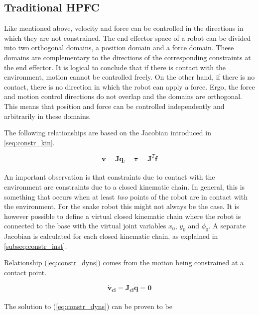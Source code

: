 \subsection{Traditional HPFC} \label{subseq:HPFC}

Like mentioned above, velocity and force can be controlled in the directions in which they are not constrained. The end effector space of a robot can be divided into two orthogonal domains, a position domain and a force domain. These domains are complementary to the directions of the corresponding constraints at the end effector. It is logical to conclude that if there is contact with the environment, motion cannot be controlled freely. On the other hand, if there is no contact, there is no direction in which the robot can apply a force. Ergo, the force and motion control directions do not overlap and the domains are orthogonal. This means that position and force can be controlled independently and arbitrarily in these domains.

The following relationships are based on the Jacobian introduced in \ref{seq:constr_kin}. 

\begin{equation}
	\mathbf{v = J \dot{q}} \textrm{,} \quad  \  \boldsymbol{\tau} \mathbf{= J}^T \mathbf{f}
\end{equation}
\\
An important observation is that constraints due to contact with the environment are constraints due to a closed kinematic chain. In general, this is something that occurs when at least \textit{two} points of the robot are in contact with the environment. For the snake robot this might not always be the case. It is however possible to define a virtual closed kinematic chain where the robot is connected to the base with the virtual joint variables $x_0$, $y_0$ and $\phi_0$.
A separate Jacobian is calculated for each closed kinematic chain, as explained in \ref{subseq:constr_inst}.

Relationship (\ref{eq:constr_dyns}) comes from the motion being constrained at a contact point.

\begin{equation} \label{eq:constr_dyns}
    \mathbf{\dot{v}_{ci} = J_{ci} \dot{q} = 0}
\end{equation}
\\
The solution to (\ref{eq:constr_dyns}) can be proven to be

